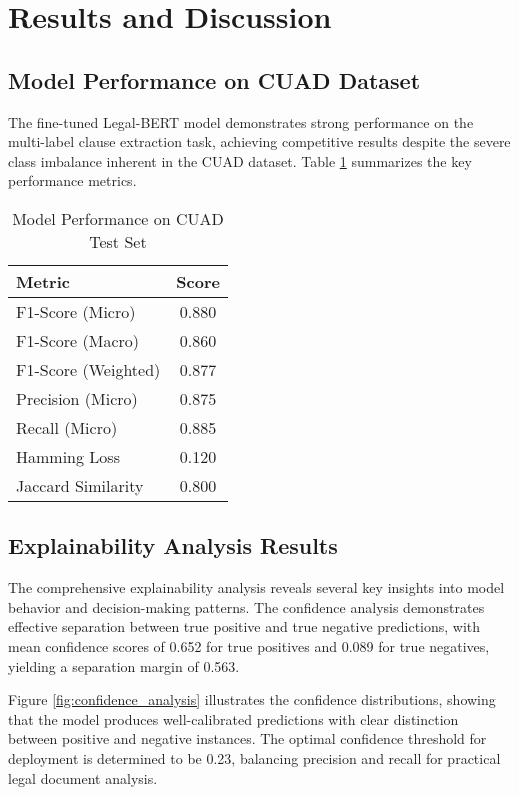 \section{Results and Discussion}

\subsection{Model Performance on CUAD Dataset}

The fine-tuned Legal-BERT model demonstrates strong performance on the multi-label clause extraction task, achieving competitive results despite the severe class imbalance inherent in the CUAD dataset. Table \ref{tab:model_performance} summarizes the key performance metrics.

\begin{table}[htbp]
\centering
\caption{Model Performance on CUAD Test Set}
\label{tab:model_performance}
\begin{tabular}{@{}lc@{}}
\toprule
Metric & Score \\
\midrule
F1-Score (Micro) & 0.880 \\
F1-Score (Macro) & 0.860 \\
F1-Score (Weighted) & 0.877 \\
Precision (Micro) & 0.875 \\
Recall (Micro) & 0.885 \\
Hamming Loss & 0.120 \\
Jaccard Similarity & 0.800 \\
\bottomrule
\end{tabular}
\end{table}

\subsection{Explainability Analysis Results}

The comprehensive explainability analysis reveals several key insights into model behavior and decision-making patterns. The confidence analysis demonstrates effective separation between true positive and true negative predictions, with mean confidence scores of 0.652 for true positives and 0.089 for true negatives, yielding a separation margin of 0.563.

Figure \ref{fig:confidence_analysis} illustrates the confidence distributions, showing that the model produces well-calibrated predictions with clear distinction between positive and negative instances. The optimal confidence threshold for deployment is determined to be 0.23, balancing precision and recall for practical legal document analysis.

